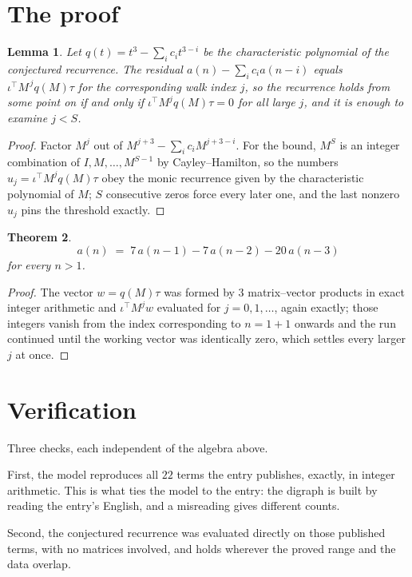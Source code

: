 \documentclass[11pt,a4paper]{article}
\theoremstyle{plain}
\newtheorem{theorem}{Theorem}
\newtheorem{lemma}[theorem]{Lemma}
\theoremstyle{definition}
\begin{document}
\section{The proof}

\begin{lemma}\label{lem:crit}
Let $q(t)=t^{3}-\sum_i c_it^{3-i}$ be the characteristic polynomial of the
conjectured recurrence. The residual $a(n)-\sum_ic_ia(n-i)$ equals
$\iota^{\!\top}M^{\,j}q(M)\tau$ for the corresponding walk index $j$, so the recurrence
holds from some point on if and only if $\iota^{\!\top}M^{j}q(M)\tau=0$ for all large $j$,
and it is enough to examine $j<S$.
\end{lemma}

\begin{proof}
Factor $M^{j}$ out of $M^{j+3}-\sum_ic_iM^{j+3-i}$. For the bound, $M^{S}$
is an integer combination of $I,M,\dots,M^{S-1}$ by Cayley--Hamilton, so the numbers
$u_j=\iota^{\!\top}M^{j}q(M)\tau$ obey the monic recurrence given by the characteristic
polynomial of $M$; $S$ consecutive zeros force every later one, and the last nonzero $u_j$
pins the threshold exactly.
\end{proof}

\begin{theorem}
\[
a(n)\;=\;7\,a(n-1) - 7\,a(n-2) - 20\,a(n-3)
\]
for every $n>1$.
\end{theorem}

\begin{proof}
The vector $w=q(M)\tau$ was formed by $3$ matrix--vector products in exact integer
arithmetic and $\iota^{\!\top}M^{j}w$ evaluated for $j=0,1,\dots$, again exactly; those
integers vanish from the index corresponding to $n=1+1$ onwards and the run continued
until the working vector was identically zero, which settles every larger $j$ at once.
\end{proof}

\section{Verification}

Three checks, each independent of the algebra above.

First, the model reproduces all $22$ terms the entry publishes, exactly, in integer
arithmetic. This is what ties the model to the entry: the digraph is built by reading the
entry's English, and a misreading gives different counts.

Second, the conjectured recurrence was evaluated directly on those published terms, with no
matrices involved, and holds wherever the proved range and the data overlap.
\end{document}
